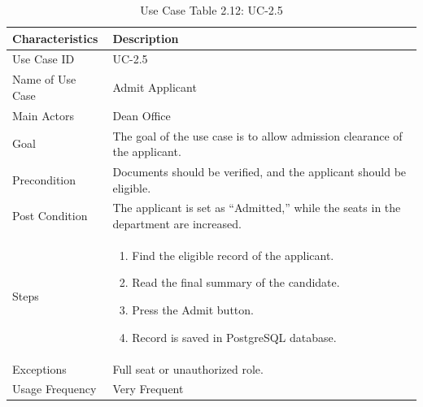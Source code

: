 \begin{table}[H]
    \centering
    \small
    \renewcommand{\arraystretch}{1.4}
    \caption{Use Case Table 2.12: UC-2.5}
    \label{tab:dean_admit}
    
    \begin{tabularx}{\textwidth}{|l|X|}
        \hline
        \rowcolor[gray]{0.9} {Characteristics} & {Description} \\ \hline
        Use Case ID & UC-2.5 \\ \hline
        Name of Use Case & Admit Applicant \\ \hline
        Main Actors & Dean Office \\ \hline
        Goal & The goal of the use case is to allow admission clearance of the applicant. \\ \hline
        Precondition & Documents should be verified, and the applicant should be eligible. \\ \hline
        Post Condition & The applicant is set as “Admitted,” while the seats in the department are increased. \\ \hline
        Steps & 
        \begin{enumerate}[nosep, leftmargin=*]
            \item Find the eligible record of the applicant.
            \item Read the final summary of the candidate.
            \item Press the Admit button.
            \item Record is saved in PostgreSQL database.
        \end{enumerate} \\ \hline
        Exceptions & Full seat or unauthorized role. \\ \hline
        Usage Frequency & Very Frequent \\ \hline
    \end{tabularx}
\end{table}
\FloatBarrier